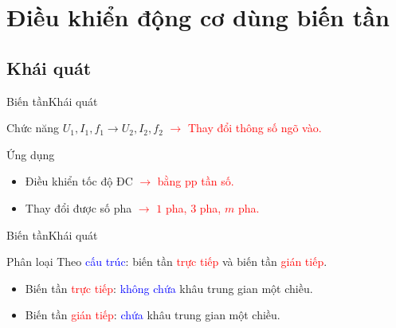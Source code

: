 \documentclass[14pt]{beamer}
\newcommand{\giaithich}[1]{\textcolor{red}{$\longrightarrow$ #1}}
\newcommand{\noibat}[1]{\textcolor{red}{#1}}
\begin{document}
\section[Biến tần]{Điều khiển động cơ dùng biến tần}
\subsection*{Khái quát}
\begin{frame}{Biến tần}{Khái quát}
	\begin{block}{Chức năng}	
		$U_1, I_1, f_1 \longrightarrow U_2, I_2, f_2$
		\giaithich{Thay đổi thông số ngõ vào.}
	\end{block}
	
	\begin{block}{Ứng dụng}
		\begin{itemize}
			\item Điều khiển tốc độ ĐC \giaithich{bằng pp tần số.}
			\item Thay đổi được số pha \giaithich{$1$ pha, $3$ pha, $m$ pha.}
		\end{itemize}
	\end{block}
\end{frame}

\begin{frame}{Biến tần}{Khái quát}
	\begin{block}{Phân loại}
		Theo \textcolor{blue}{cấu trúc}: biến tần \noibat{trực tiếp} và biến tần \noibat{gián tiếp}.
		\begin{itemize}
			\item Biến tần \noibat{trực tiếp}: \textcolor{blue}{không chứa} khâu trung gian một chiều.
			\item Biến tần \noibat{gián tiếp}: \textcolor{blue}{chứa} khâu trung gian một chiều.
		\end{itemize}
	\end{block}
\end{frame}
\end{document}
